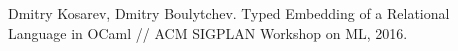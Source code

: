 \documentclass[preprint,numbers,10pt]{sigplanconf}
\begin{document}
\begin{thebibliography}{99}
Dmitry Kosarev, Dmitry Boulytchev. Typed Embedding of a Relational Language in OCaml // ACM SIGPLAN Workshop on ML, 2016.



\end{thebibliography}
\end{document}
